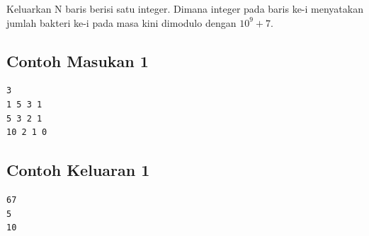 \documentclass{article}
\begin{document}
Keluarkan N baris berisi satu integer. Dimana integer pada baris ke-i menyatakan jumlah bakteri ke-i pada masa kini dimodulo dengan $10^{9}+7$.
\\

\begin{multicols}{2}
\subsection*{Contoh Masukan 1}
\begin{lstlisting}
3
1 5 3 1
5 3 2 1
10 2 1 0
\end{lstlisting}
\columnbreak
\subsection*{Contoh Keluaran 1}
\begin{lstlisting}
67
5
10
\end{lstlisting}
\vfill
\null
\end{multicols}

%
%
%

%
%
\end{document}
